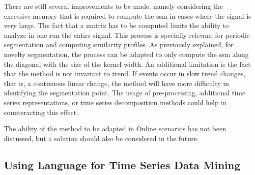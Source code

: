 \par
There are still several improvements to be made, namely considering the excessive memory that is required to compute the \gls{ssm} in cases where the signal is very large. The fact that a matrix has to be computed limits the ability to analyze in one run the entire signal. This process is specially relevant for periodic segmentation and computing similarity profiles. As previously explained, for novelty segmentation, the process can be adapted to only compute the \gls{ssm} along the diagonal with the size of the kernel width. An additional limitation is the fact that the method is not invariant to trend. If events occur in slow trend changes, that is, a continuous linear change, the method will have more difficulty in identifying the segmentation point. The usage of pre-processing, additional time series representations, or time series decomposition methods could help in counteracting this effect.
\par
The ability of the method to be adapted in Online scenarios has not been discussed, but a solution should also be considered in the future.

\subsection{Using Language for Time Series Data Mining}

